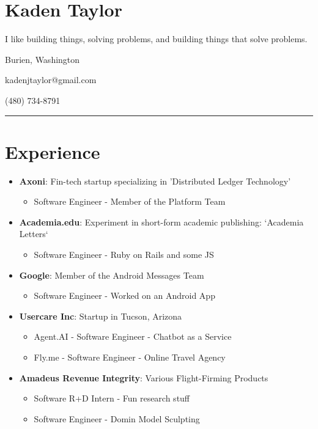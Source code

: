 \documentclass{article}
\begin{document}
\section*{Kaden Taylor}
I like building things, solving problems, and building things that solve problems.
\newline

Burien, Washington

kadenjtaylor@gmail.com

(480) 734-8791

\noindent\rule{\linewidth}{1pt}

\section*{Experience}

\begin{itemize}\item \textbf{Axoni}: Fin-tech startup specializing in 'Distributed Ledger Technology' \begin{itemize}\item Software Engineer - Member of the Platform Team\end{itemize}
\item \textbf{Academia.edu}: Experiment in short-form academic publishing: `Academia Letters` \begin{itemize}\item Software Engineer - Ruby on Rails and some JS\end{itemize}
\item \textbf{Google}: Member of the Android Messages Team \begin{itemize}\item Software Engineer - Worked on an Android App\end{itemize}
\item \textbf{Usercare Inc}: Startup in Tucson, Arizona \begin{itemize}\item Agent.AI - Software Engineer - Chatbot as a Service
\item Fly.me - Software Engineer - Online Travel Agency\end{itemize}
\item \textbf{Amadeus Revenue Integrity}: Various Flight-Firming Products \begin{itemize}\item Software R+D Intern - Fun research stuff
\item Software Engineer - Domin Model Sculpting\end{itemize}\end{itemize}
\end{document}
